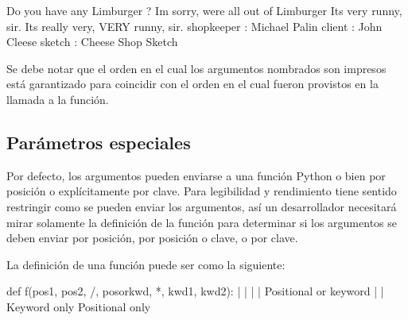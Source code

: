 \documentclass[a5paper,10pt,spanish]{sphinxmanual}
\begin{document}
\begin{sphinxVerbatim}[commandchars=\\\{\}]
\PYGZhy{}\PYGZhy{} Do you have any Limburger ?
\PYGZhy{}\PYGZhy{} I\PYGZsq{}m sorry, we\PYGZsq{}re all out of Limburger
It\PYGZsq{}s very runny, sir.
It\PYGZsq{}s really very, VERY runny, sir.
\PYGZhy{}\PYGZhy{}\PYGZhy{}\PYGZhy{}\PYGZhy{}\PYGZhy{}\PYGZhy{}\PYGZhy{}\PYGZhy{}\PYGZhy{}\PYGZhy{}\PYGZhy{}\PYGZhy{}\PYGZhy{}\PYGZhy{}\PYGZhy{}\PYGZhy{}\PYGZhy{}\PYGZhy{}\PYGZhy{}\PYGZhy{}\PYGZhy{}\PYGZhy{}\PYGZhy{}\PYGZhy{}\PYGZhy{}\PYGZhy{}\PYGZhy{}\PYGZhy{}\PYGZhy{}\PYGZhy{}\PYGZhy{}\PYGZhy{}\PYGZhy{}\PYGZhy{}\PYGZhy{}\PYGZhy{}\PYGZhy{}\PYGZhy{}\PYGZhy{}
shopkeeper : Michael Palin
client : John Cleese
sketch : Cheese Shop Sketch
\end{sphinxVerbatim}

\sphinxAtStartPar
Se debe notar que el orden en el cual los argumentos nombrados son impresos está garantizado para coincidir con el orden en el cual fueron provistos en la llamada a la función.


\subsection{Parámetros especiales}
\label{\detokenize{tutorial/controlflow:special-parameters}}
\sphinxAtStartPar
Por defecto, los argumentos pueden enviarse a una función Python o bien por posición o explícitamente por clave. Para legibilidad y rendimiento tiene sentido restringir como se pueden enviar los argumentos, así un desarrollador necesitará mirar solamente la definición de la función para determinar si los argumentos se deben enviar por posición, por posición o clave, o por clave.

\sphinxAtStartPar
La definición de una función puede ser como la siguiente:

\begin{sphinxVerbatim}[commandchars=\\\{\}]
def f(pos1, pos2, /, pos\PYGZus{}or\PYGZus{}kwd, *, kwd1, kwd2):
      \PYGZhy{}\PYGZhy{}\PYGZhy{}\PYGZhy{}\PYGZhy{}\PYGZhy{}\PYGZhy{}\PYGZhy{}\PYGZhy{}\PYGZhy{}\PYGZhy{}    \PYGZhy{}\PYGZhy{}\PYGZhy{}\PYGZhy{}\PYGZhy{}\PYGZhy{}\PYGZhy{}\PYGZhy{}\PYGZhy{}\PYGZhy{}     \PYGZhy{}\PYGZhy{}\PYGZhy{}\PYGZhy{}\PYGZhy{}\PYGZhy{}\PYGZhy{}\PYGZhy{}\PYGZhy{}\PYGZhy{}
        |             |                  |
        |        Positional or keyword   |
        |                                \PYGZhy{} Keyword only
         \PYGZhy{}\PYGZhy{} Positional only
\end{sphinxVerbatim}
\end{document}
